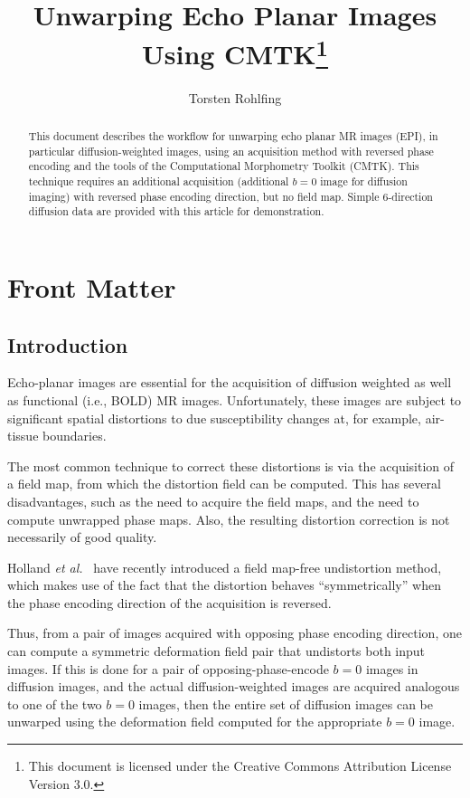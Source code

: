 \documentclass{InsightArticle}
\title{Unwarping Echo Planar Images Using CMTK\footnote{This document is licensed under
    the Creative Commons Attribution License Version 3.0.}}
\author{Torsten Rohlfing}
\begin{document}
\maketitle

\ifhtml
\chapter*{Front Matter\label{front}}
\fi


\begin{abstract}
\noindent This document describes the workflow for unwarping echo planar MR
images (EPI), in particular diffusion-weighted images, using an acquisition
method with reversed phase encoding and the tools of the Computational
Morphometry Toolkit (CMTK). This technique requires an additional acquisition
(additional $b=0$ image for diffusion imaging) with reversed phase encoding
direction, but no field map. Simple 6-direction diffusion data are provided
with this article for demonstration.
\end{abstract}

\tableofcontents

\clearpage
\section{Introduction}

Echo-planar images are essential for the acquisition of diffusion weighted as
well as functional (i.e., BOLD) MR images. Unfortunately, these images are
subject to significant spatial distortions to due susceptibility changes at,
for example, air-tissue boundaries.

The most common technique to correct these distortions is via the acquisition
of a field map, from which the distortion field can be computed. This has
several disadvantages, such as the need to acquire the field maps, and the
need to compute unwrapped phase maps. Also, the resulting distortion
correction is not necessarily of good quality.

Holland {\em et al.\/}~\cite{HollKupeDale:2010} have recently introduced a
field map-free undistortion method, which makes use of the fact that the
distortion behaves ``symmetrically'' when the phase encoding direction of the
acquisition is reversed.

Thus, from a pair of images acquired with opposing phase encoding direction,
one can compute a symmetric deformation field pair that undistorts both input
images. If this is done for a pair of opposing-phase-encode $b=0$ images in
diffusion images, and the actual diffusion-weighted images are acquired
analogous to one of the two $b=0$ images, then the entire set of diffusion
images can be unwarped using the deformation field computed for the
appropriate $b=0$ image.
\end{document}
